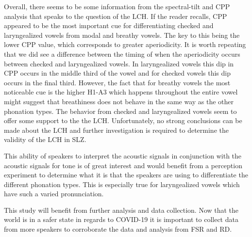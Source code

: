 \documentclass[12pt, letterpaper]{article}
\begin{document}
Overall, there seems to be some information from the spectral-tilt and CPP analysis that speaks to the question of the LCH. If the reader recalls, CPP appeared to be the most important cue for differentiating checked and laryngealized vowels from modal and breathy vowels. The key to this being the lower CPP value, which corresponds to greater aperiodicity. It is worth repeating that we did see a difference between the timing of when the aperiodicity occurs between checked and laryngealized vowels. In laryngealized vowels this dip in CPP occurs in the middle third of the vowel and for checked vowels this dip occurs in the final third. However, the fact that for breathy vowels the most noticeable cue is the higher H1-A3 which happens throughout the entire vowel might suggest that breathiness does not behave in the same way as the other phonation types. The behavior from checked and laryngealized vowels seem to offer some support to the the LCH. Unfortunately, no strong conclusions can be made about the LCH and further investigation is required to determine the validity of the LCH in SLZ. 

This ability of speakers to interpret the acoustic signals in conjunction with the acoustic signals for tone is of great interest and would benefit from a perception experiment to determine what it is that the speakers are using to differentiate the different phonation types. This is especially true for laryngealized vowels which have such a varied pronunciation. 

This study will benefit from further analysis and data collection. Now that the world is in a safer state in regards to COVID-19 it is important to collect data from more speakers to corroborate the data and analysis from FSR and RD. 




\printbibliography[heading=bibintoc]
\end{document}
